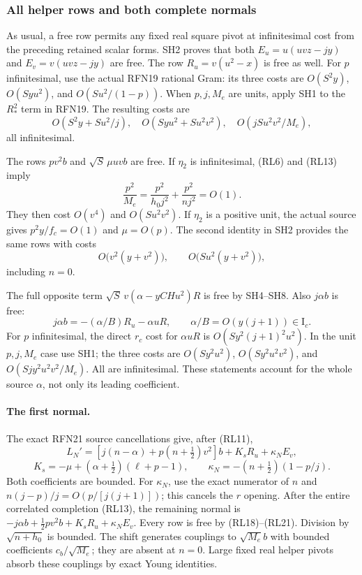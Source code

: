 \subsubsection*{All helper rows and both complete normals}

As usual, a free row permits any fixed real square pivot at
infinitesimal cost from the preceding retained scalar forms.
SH2 proves that both \(E_u=u(uvz-jy)\) and \(E_v=v(uvz-jy)\)
are free.  The row \(R_u=v(u^2-x)\) is free as well.
For \(p\) infinitesimal, use the actual RFN19 rational Gram:
its three costs are \(O(S^2y)\), \(O(Syu^2)\),
and \(O(Su^2/(1-p))\).
When \(p,j,M_e\) are units, apply SH1 to the \(R_*^2\)
term in RFN19.  The resulting costs are
\[
 O(S^2y+Su^2/j),\quad O(Syu^2+Su^2v^2),\quad
 O(jSu^2v^2/M_e),                                    \tag{RL18}
\]
all infinitesimal.

The rows \(pv^2b\) and \(\sqrt S\,\mu uvb\) are free.
If \(\eta_2\) is infinitesimal, (RL6) and (RL13) imply
\[
 \frac{p^2}{M_e}
  =\frac{p^2}{h_0j^2}+\frac{p^2}{nj^2}=O(1).
                                                               \tag{RL19}
\]
They then cost \(O(v^4)\) and \(O(Su^2v^2)\).
If \(\eta_2\) is a positive unit, the actual source gives
\(p^2y/f_c=O(1)\) and \(\mu=O(p)\).
The second identity in SH2 provides the same rows with costs
\[
 O\bigl(v^2(y+v^2)\bigr),\qquad
 O\bigl(Su^2(y+v^2)\bigr),                             \tag{RL20}
\]
including \(n=0\).

The full opposite term \(\sqrt S\,v(\alpha-yCHu^2)R\)
is free by SH4--SH8.  Also \(j\alpha b\) is free:
\[
 j\alpha b=-(\alpha/B)R_u-\alpha uR,\qquad
 \alpha/B=O(y(j+1))\in\mathrm I_c.
                                                               \tag{RL21}
\]
For \(p\) infinitesimal, the direct \(r_c\) cost for
\(\alpha uR\) is \(O(Sy^2(j+1)^2u^2)\).
In the unit \(p,j,M_e\) case use SH1; the three costs
are \(O(Sy^2u^2)\), \(O(Sy^2u^2v^2)\), and
\(O(Sjy^2u^2v^2/M_e)\).  All are infinitesimal.
These statements account for the whole source \(\alpha\), not
only its leading coefficient.

\paragraph{The first normal.}
The exact RFN21 source cancellations give, after (RL11),
\[
 L_N'=[j(n-\alpha)+p(n+\tfrac12)v^2]b
             +K_sR_u+\kappa_NE_v,                     \tag{RL22}
\]
\[
 K_s=-\mu+(\alpha+\tfrac12)(\ell+p-1),\qquad
 \kappa_N=-(n+\tfrac12)(1-p/j).
\]
Both coefficients are bounded.  For \(\kappa_N\), use the
exact numerator of \(n\) and
\(n(j-p)/j=O(p/[j(j+1)])\); this cancels the \(r\) opening.
After the entire correlated completion (RL13), the remaining
normal is
\(-j\alpha b+\tfrac12pv^2b+K_sR_u+\kappa_NE_v\).
Every row is free by (RL18)--(RL21).
Division by \(\sqrt{n+h_0}\) is bounded.
The shift generates couplings to \(\sqrt{M_e}b\) with bounded
coefficients \(c_b/\sqrt{M_e}\); they are absent at \(n=0\).
Large fixed real helper pivots absorb these couplings by exact
Young identities.

